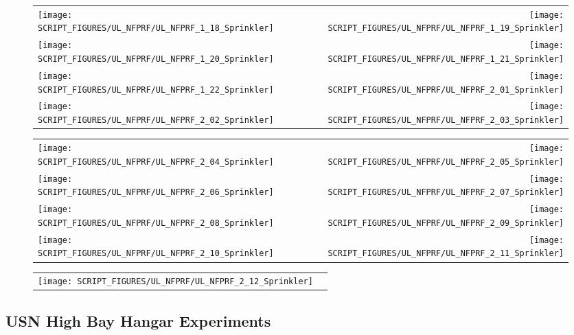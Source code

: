\begin{figure}[p]
\begin{tabular*}{\textwidth}{l@{\extracolsep{\fill}}r}
\texttt{[image: SCRIPT\_FIGURES/UL\_NFPRF/UL\_NFPRF\_1\_18\_Sprinkler]} &
\texttt{[image: SCRIPT\_FIGURES/UL\_NFPRF/UL\_NFPRF\_1\_19\_Sprinkler]} \\
\texttt{[image: SCRIPT\_FIGURES/UL\_NFPRF/UL\_NFPRF\_1\_20\_Sprinkler]} &
\texttt{[image: SCRIPT\_FIGURES/UL\_NFPRF/UL\_NFPRF\_1\_21\_Sprinkler]} \\
\texttt{[image: SCRIPT\_FIGURES/UL\_NFPRF/UL\_NFPRF\_1\_22\_Sprinkler]} &
\texttt{[image: SCRIPT\_FIGURES/UL\_NFPRF/UL\_NFPRF\_2\_01\_Sprinkler]} \\
\texttt{[image: SCRIPT\_FIGURES/UL\_NFPRF/UL\_NFPRF\_2\_02\_Sprinkler]} &
\texttt{[image: SCRIPT\_FIGURES/UL\_NFPRF/UL\_NFPRF\_2\_03\_Sprinkler]}
\end{tabular*}
\end{figure}

\begin{figure}[p]
\begin{tabular*}{\textwidth}{l@{\extracolsep{\fill}}r}
\texttt{[image: SCRIPT\_FIGURES/UL\_NFPRF/UL\_NFPRF\_2\_04\_Sprinkler]} &
\texttt{[image: SCRIPT\_FIGURES/UL\_NFPRF/UL\_NFPRF\_2\_05\_Sprinkler]} \\
\texttt{[image: SCRIPT\_FIGURES/UL\_NFPRF/UL\_NFPRF\_2\_06\_Sprinkler]} &
\texttt{[image: SCRIPT\_FIGURES/UL\_NFPRF/UL\_NFPRF\_2\_07\_Sprinkler]} \\
\texttt{[image: SCRIPT\_FIGURES/UL\_NFPRF/UL\_NFPRF\_2\_08\_Sprinkler]} &
\texttt{[image: SCRIPT\_FIGURES/UL\_NFPRF/UL\_NFPRF\_2\_09\_Sprinkler]} \\
\texttt{[image: SCRIPT\_FIGURES/UL\_NFPRF/UL\_NFPRF\_2\_10\_Sprinkler]} &
\texttt{[image: SCRIPT\_FIGURES/UL\_NFPRF/UL\_NFPRF\_2\_11\_Sprinkler]}
\end{tabular*}
\end{figure}

\begin{figure}[p]
\begin{tabular*}{\textwidth}{l@{\extracolsep{\fill}}r}
\texttt{[image: SCRIPT\_FIGURES/UL\_NFPRF/UL\_NFPRF\_2\_12\_Sprinkler]}
\end{tabular*}
\end{figure}

\clearpage

\subsection{USN High Bay Hangar Experiments}

